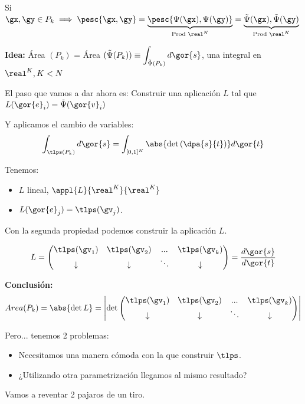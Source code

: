 \obs Si $\gx,\gy\in P_k \implies \pesc{\gx,\gy} = \underbrace{\pesc{\Psi(\gx),\Psi(\gy)}}_{\text{Prod } \real^N} = \underbrace{{\tilde{\Psi}(\gx),\tilde{\Psi}(\gy)}}_{\text{Prod } \real^K}$


\textbf{Idea:} Área $(P_k)$ = Área $(\tilde{\Psi}(P_k)) \equiv \displaystyle \int_{\tilde{\Psi}(P_k)}d\gor{s}$, una integral en $\real^K, K<N$



El paso que vamos a dar ahora es: Construir una aplicación $L$ tal que $L(\gor{e}_i) = \tilde{\Psi}(\gor{v}_i)$

Y aplicamos el cambio de variables:
\[\int_{\tlps(P_k)} d\gor{s} = \int_{[0,1]^K} \abs{\det\left( \dpa{s}{t} \right)} d\gor{t}\]

Tenemos: 
\begin{itemize}
\item $L$ lineal, $\appl{L}{\real^K}{\real^K}$
\item $L(\gor{e}_j) = \tlps(\gv_j)$.
\end{itemize}
Con la segunda propiedad podemos construir la aplicación $L$.

\begin{gather*}
L = \begin{pmatrix} \tlps(\gv_1) & \tlps(\gv_2) & ... & \tlps(\gv_k)\\
\downarrow & \downarrow & \ddots & \downarrow
\end{pmatrix} = \frac{d\gor{s}}{d\gor{t}}\end{gather*}

\textbf{Conclusión:} \[Area(P_k) = \abs{\det L} = \left|\det \begin{pmatrix}
\tlps(\gv_1) & \tlps(\gv_2) & ... & \tlps(\gv_k)\\
\downarrow & \downarrow & \ddots & \downarrow
\end{pmatrix}\right|\]

Pero... tenemos 2 problemas:
\begin{itemize}
\item Necesitamos una manera cómoda con la que construir $\tlps$.
\item ¿Utilizando otra parametrización llegamos al mismo resultado?
\end{itemize}

Vamos a reventar 2 pajaros de un tiro.

